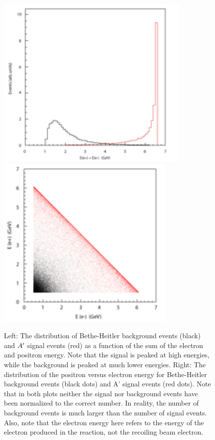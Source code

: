 \begin{figure}
\includegraphics[scale=1]{measurements/rad-bh-energy.pdf}
\includegraphics[scale=1]{measurements/E1vsE2.pdf}
\caption{ Left: The distribution of Bethe-Heitler background events (black) and $A^\prime$ signal events (red) as a function of the sum of the electron and positron energy. Note that the signal is peaked at high energies, while the background is peaked at much lower energies. Right: The distribution of the positron versus electron energy for Bethe-Heitler background events (black dots) and A’ signal events (red dots). Note that in both plots neither the signal nor background events have been normalized to the correct number. In reality, the number of background events is much larger than the number of signal events. Also, note that the electron energy here refers to the energy of the electron produced in the reaction, not the recoiling beam electron.}
\label{fig:tridentkinematics}
\end{figure}



